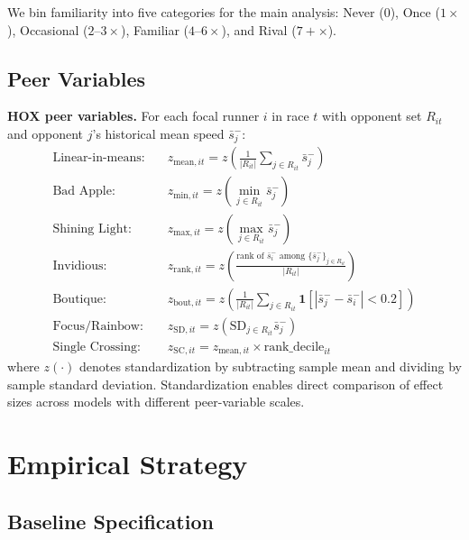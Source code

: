 \documentclass[12pt]{article}
\theoremstyle{definition}
\theoremstyle{remark}
\begin{document}
We bin familiarity into five categories for the main analysis:
Never (0), Once ($1\times$), Occasional ($2$--$3\times$), Familiar ($4$--$6\times$),
and Rival ($7+\times$).

\subsection{Peer Variables}

\textbf{HOX peer variables.}
For each focal runner $i$ in race $t$ with opponent set $R_{it}$
and opponent $j$'s historical mean speed $\bar{s}_j^-$:
\begin{align}
\text{Linear-in-means:} &\quad z_{\text{mean},it} = z\!\left(\frac{1}{|R_{it}|}\sum_{j\in R_{it}}\bar{s}_j^-\right) \\
\text{Bad Apple:}       &\quad z_{\text{min},it} = z\!\left(\min_{j\in R_{it}}\bar{s}_j^-\right) \\
\text{Shining Light:}   &\quad z_{\text{max},it} = z\!\left(\max_{j\in R_{it}}\bar{s}_j^-\right) \\
\text{Invidious:}       &\quad z_{\text{rank},it} = z\!\left(\frac{\text{rank of }\bar{s}_i^- \text{ among }\{{\bar{s}_j^-}\}_{j\in R_{it}}}{|R_{it}|}\right) \\
\text{Boutique:}        &\quad z_{\text{bout},it} = z\!\left(\frac{1}{|R_{it}|}\sum_{j\in R_{it}}\mathbf{1}\!\left[|\bar{s}_j^- - \bar{s}_i^-| < 0.2\right]\right) \\
\text{Focus/Rainbow:}   &\quad z_{\text{SD},it} = z\!\left(\text{SD}_{j\in R_{it}}\bar{s}_j^-\right) \\
\text{Single Crossing:} &\quad z_{\text{SC},it} = z_{\text{mean},it} \times \text{rank\_decile}_{it}
\end{align}
where $z(\cdot)$ denotes standardization by subtracting sample mean and dividing by
sample standard deviation.
Standardization enables direct comparison of effect sizes across models with
different peer-variable scales.

\section{Empirical Strategy}
\label{sec:empirics}

\subsection{Baseline Specification}
\end{document}
